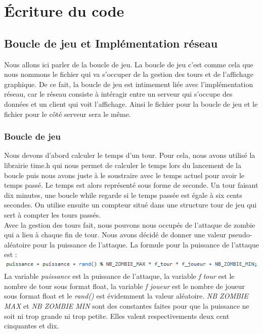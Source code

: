 \documentclass[a4paper,11pt]{article}
\begin{document}
\newpage

\section {Écriture du code}

\subsection{Boucle de jeu et Implémentation réseau}

Nous allons ici parler de la boucle de jeu. La boucle de jeu c'est comme cela que nous nommons le fichier qui va s'occuper de la gestion des tours et de l'affichage graphique. De ce fait, la boucle de jeu est intimement liée avec l'implémentation réseau, car le réseau consiste à intéragir entre un serveur qui s'occupe des données et un client qui voit l'affichage. Ainsi le fichier pour la boucle de jeu et le fichier pour le côté serveur sera le même.

\subsubsection{Boucle de jeu}

Nous devons d'abord calculer le temps d'un tour. Pour cela, nous avons utilisé la librairie time.h qui nous permet de calculer le temps lors du lancement de la boucle puis nous avons juste à le soustraire avec le temps actuel pour avoir le temps passé. Le temps est alors représenté sous forme de seconde. Un tour faisant dix minutes, une boucle while regarde si le temps passée est égale à six cents secondes. On utilise ensuite un compteur situé dans une structure tour de jeu qui sert à compter les tours passés.
\\

Avec la gestion des tours fait, nous pouvons nous occupés de l'attaque de zombie qui a lieu à chaque fin de tour. Nous avons décidé de donner une valeur pseudo-aléatoire pour la puissance de l'attaque. La formule pour la puissance de l'attaque est :
\\
\includegraphics[width=\textwidth] {puissance.PNG}
La variable \textit{puissance} est la puissance de l'attaque, la variable \textit{f tour} est le nombre de tour sous format float, la variable \textit{f joueur} est le nombre de joueur sous format float et le \textit{rand()} est évidemment la valeur aléatoire. \textit{NB ZOMBIE MAX} et \textit{NB ZOMBIE MIN} sont des constantes faites pour que la puissance ne soit ni trop grande ni trop petite. Elles valent respectivements deux cent cinquantes et dix.
\end{document}
